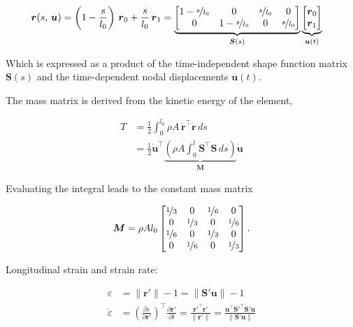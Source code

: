 \begin{align}
\boldsymbol{r}(s,\,\boldsymbol{u}) &= \left(1 - \frac{s}{l_{0}}\right)\,\boldsymbol{r}_{0} + \frac{s}{l_{0}}\,\boldsymbol{r}_{1} =
\underbrace{
\begin{bmatrix}
1 - \nicefrac{s}{l_{0}} & 0  & \nicefrac{s}{l_{0}} & 0 \\
0 & 1 - \nicefrac{s}{l_{0}} & 0 & \nicefrac{s}{l_{0}}
\end{bmatrix}
}_{\boldsymbol{S}(s)}
\underbrace{
\begin{bmatrix}
\boldsymbol{r}_{0} \\
\boldsymbol{r}_{1}
\end{bmatrix}
}_{\boldsymbol{u}(t)}
\end{align}

Which is expressed as a product of the time-independent shape function matrix $\boldsymbol{S}(s)$ and the time-dependent nodal displacements $\boldsymbol{u}(t)$.

The mass matrix is derived from the kinetic energy of the element,

\begin{align}
T &= \frac{1}{2}\int_{0}^{l_{0}} \rho A\,\dot{\boldsymbol{r}}^\intercal\dot{\boldsymbol{r}}\,ds \\
&= \frac{1}{2} \dot{\boldsymbol{u}}^\intercal \underbrace{\left( \rho A \int_{0}^{l} \boldsymbol{S}^\intercal \boldsymbol{S}\,ds \right)}_{\boldsymbol{M}} \dot{\boldsymbol{u}}
\end{align}

Evaluating the integral leads to the constant mass matrix

\begin{equation}
\boldsymbol{M} = \rho Al_{0} \begin{bmatrix}
\nicefrac{1}{3} & 0 & \nicefrac{1}{6} & 0\\
0 & \nicefrac{1}{3} & 0 & \nicefrac{1}{6}\\
\nicefrac{1}{6} & 0 & \nicefrac{1}{3} & 0\\
0 & \nicefrac{1}{6} & 0 & \nicefrac{1}{3}
\end{bmatrix}.
\end{equation}

Longitudinal strain and strain rate:

\begin{align}
\varepsilon &= \lVert\boldsymbol{r}'\rVert - 1 = \lVert \boldsymbol{S}'\boldsymbol{u} \rVert - 1 \\
\dot{\varepsilon} &= \left(\frac{\partial \varepsilon}{\partial \boldsymbol{r}'}\right)^\intercal\frac{\partial \boldsymbol{r}'}{\partial t} = \frac{\boldsymbol{r}'^\intercal\dot{\boldsymbol{r}'}}{\lVert\boldsymbol{r}'\rVert} = \frac{\boldsymbol{u}^\intercal\boldsymbol{S}'^\intercal\boldsymbol{S}' \dot{\boldsymbol{u}}}{\lVert \boldsymbol{S}'\boldsymbol{u} \rVert}
\end{align}

